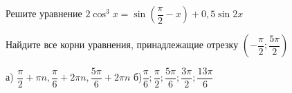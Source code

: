 \begin{ex}
	\begin{condition}
		\begin{enumcols}[label=\asbuk*)]
			\item Решите уравнение \( 2\cos^3 x = \sin{\left(\dfrac{\pi}{2}- x\right)}+0,5\sin 2x \)
			\item Найдите все корни уравнения, принадлежащие отрезку \( \left(-\dfrac{\pi}{2};\dfrac{5\pi}{2}\right) \)
		\end{enumcols}
	\end{condition}
	\answer{}
\end{ex}а) $\dfrac{\pi}{2}+\pi n,\dfrac{\pi}{6} + 2\pi n,\dfrac{5\pi}{6}+2\pi n$ б)$\dfrac{\pi}{6};\dfrac{\pi}{2};\dfrac{5\pi}{6};\dfrac{3\pi}{2};\dfrac{13\pi}{6}$